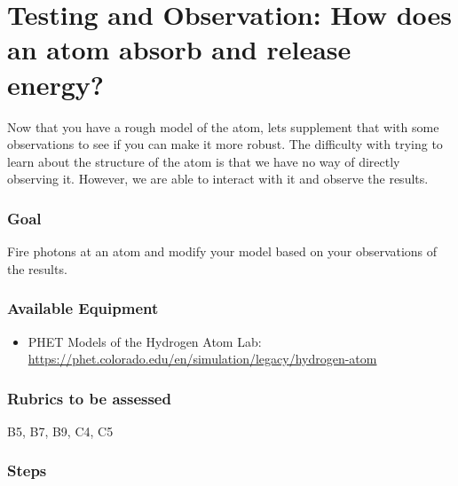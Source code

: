 \section{Testing and Observation: How does an atom absorb and release energy?} 

Now that you have a rough model of the atom, lets supplement that with some observations to see if you can make it more robust. The difficulty with trying to learn about the structure of the atom is that we have no way of directly observing it. However, we are able to interact with it and observe the results.

\subsubsection{Goal}
 Fire photons at an atom and modify your model based on your observations of the results. 

\subsubsection{Available Equipment}

\begin{itemize}
	\item PHET Models of the Hydrogen Atom Lab: \url{https://phet.colorado.edu/en/simulation/legacy/hydrogen-atom}
\end{itemize}

\subsubsection{Rubrics to be assessed}

B5, B7, B9, C4, C5

\subsubsection{Steps}

